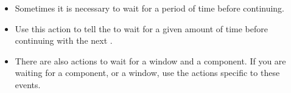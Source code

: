 \begin{itemize}
\item Sometimes it is necessary to wait for a period of time before continuing.
\item Use this action to tell the \gdagent{} to wait for a given amount of time before continuing with the next \gdstep{}. 
\item There are also actions to wait for a window and a component. If you are waiting for a component, or a window, use the actions specific to these events. 
\end{itemize}
